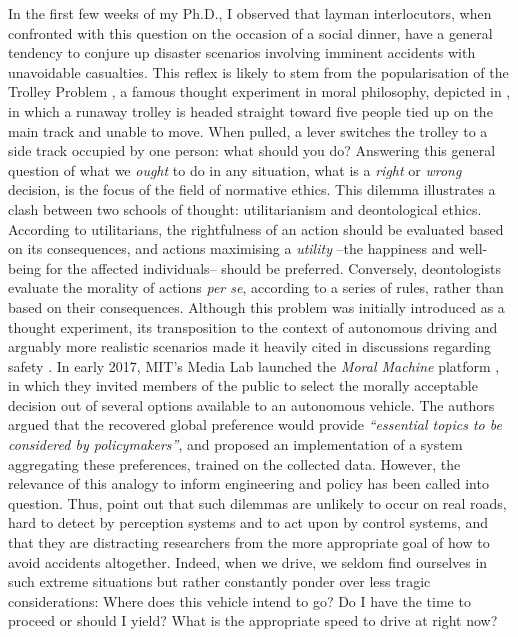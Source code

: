 In the first few weeks of my Ph.D., I observed that layman interlocutors, when confronted with this question on the occasion of a social dinner, have a general tendency to conjure up disaster scenarios involving imminent accidents with unavoidable casualties. This reflex is likely to stem from the popularisation of the Trolley Problem \citep{Foot1967}, a famous thought experiment in moral philosophy, depicted in , in which a runaway trolley is headed straight toward five people tied up on the main track and unable to move. When pulled, a lever switches the trolley to a side track occupied by one person: what should you do? Answering this general question of what we \emph{ought} to do in any situation, what is a \emph{right} or \emph{wrong} decision, is the focus of the field of {normative ethics}. This dilemma illustrates a clash between two schools of thought: utilitarianism and deontological ethics. According to utilitarians, the rightfulness of an action should be evaluated based on its consequences, and actions maximising a \emph{utility} --the happiness and well-being for the affected individuals-- should be preferred. Conversely, deontologists evaluate the morality of actions \emph{per se}, according to a series of rules, rather than based on their consequences. Although this problem was initially introduced as a thought experiment, its transposition to the context of autonomous driving and arguably more realistic scenarios made it heavily cited in discussions regarding safety \citep[\eg][]{Lin2015,Bonnefon2016,Gogoll2017}. In early 2017, MIT's Media Lab launched the \emph{Moral Machine} platform \citep{Awad2018}, in which they invited members of the public to select the morally acceptable decision out of several options available to an autonomous vehicle. The authors argued that the recovered global preference would provide \emph{\enquote{essential topics to be considered by policymakers}}, and \citep{Noothigattu2018} proposed an implementation of a system aggregating these preferences, trained on the collected data. However, the relevance of this analogy to inform engineering and policy has been called into question. Thus, \citet{DeFreitas2019} point out that such dilemmas are unlikely to occur on real roads, hard to detect by perception systems and to act upon by control systems, and that they are distracting researchers from the more appropriate goal of how to avoid accidents altogether. Indeed, when we drive, we seldom find ourselves in such extreme situations but rather constantly ponder over less tragic considerations: Where does this vehicle intend to go? Do I have the time to proceed or should I yield? What is the appropriate speed to drive at right now? 
